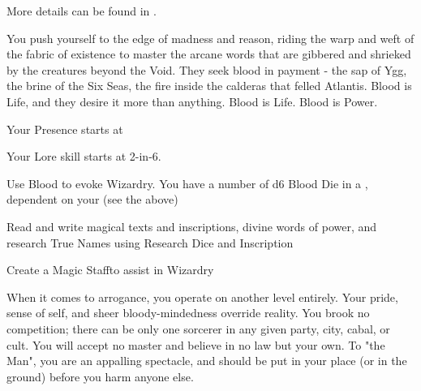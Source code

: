 {  More details can be found in .

  \newpage



  You push yourself to the edge of madness and reason, riding the warp and weft of the fabric of existence to master the arcane words that are gibbered and shrieked by the creatures beyond the Void.  They seek blood in payment - the sap of  Ygg, the brine of the Six Seas, the fire inside the calderas that felled Atlantis.  Blood is Life, and they desire it more than anything.  Blood is Life.  Blood is Power.


  
  Your Presence starts at \DCUP

  Your Lore skill starts at 2-in-6.


  Use Blood to evoke Wizardry\footnotemark.  You have a number of d6 Blood Die in a \POOL, dependent on your \LVL (see the  above)


  Read and write magical texts and inscriptions, divine words of power, and research True Names using Research Dice and Inscription\footnotemark[\value{footnote}]

  Create a Magic Staff\footnotemark[\value{footnote}] to assist in Wizardry

  When it comes to arrogance, you operate on another level entirely. Your pride, sense of self, and sheer bloody-mindedness override reality. You brook no competition; there can be only one sorcerer in any given party, city, cabal, or cult. You will accept no master and believe in no law but your own. To "the Man", you are an appalling spectacle, and should be put in your place (or in the ground) before you harm anyone else.

}
